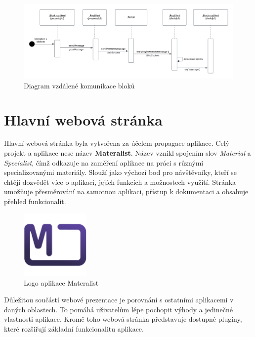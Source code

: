 \begin{figure}[ht!]
    \centering
    \includegraphics[width=1\textwidth]{media/05_realizace/vzdalenaKomunikace.pdf}
    \caption{Diagram vzdálené komunikace bloků}\label{fig:realizace/vzdalenaKomunikace}
\end{figure}


\section{Hlavní webová stránka}\label{text:realizace/hlavniStranka}


Hlavní webová stránka byla vytvořena za účelem propagace aplikace.
Celý projekt a aplikace nese název \textbf{Materalist}.
Název vznikl spojením slov \textit{Material} a \textit{Specialist}, čímž odkazuje na zaměření aplikace na práci s různými specializovanými materiály.
Slouží jako výchozí bod pro návštěvníky, kteří se chtějí dozvědět více o aplikaci, jejích funkcích a možnostech využití. 
Stránka umožňuje přesměrování na samotnou aplikaci, přístup k dokumentaci a obsahuje přehled funkcionalit.

\begin{figure}[ht!]
    \centering
    \includegraphics[width=0.3\textwidth]{media/05_realizace/logo.png}
    \caption{Logo aplikace Materalist}
    \label{fig:logo}
\end{figure}

Důležitou součástí webové prezentace je porovnání s ostatními aplikacemi v daných oblastech. 
To pomáhá uživatelům lépe pochopit výhody a jedinečné vlastnosti aplikace. 
Kromě toho webová stránka představuje dostupné pluginy, které rozšiřují základní funkcionalitu aplikace.

